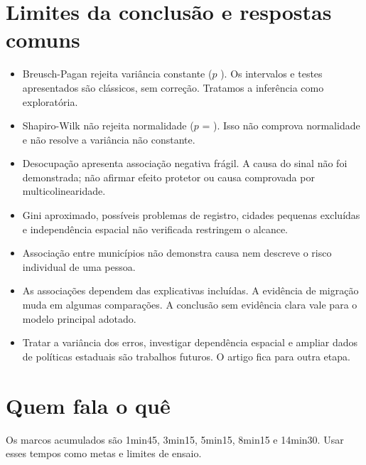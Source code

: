 \section{Limites da conclusão e respostas comuns}
\begin{itemize}
\item Breusch-Pagan rejeita variância constante ($p$ \nBPp). Os intervalos e testes apresentados são clássicos, sem correção. Tratamos a inferência como exploratória.
\item Shapiro-Wilk não rejeita normalidade ($p$ = \nSWp). Isso não comprova normalidade e não resolve a variância não constante.
\item Desocupação apresenta associação negativa frágil. A causa do sinal não foi demonstrada; não afirmar efeito protetor ou causa comprovada por multicolinearidade.
\item Gini aproximado, possíveis problemas de registro, cidades pequenas excluídas e independência espacial não verificada restringem o alcance.
\item Associação entre municípios não demonstra causa nem descreve o risco individual de uma pessoa.
\item As associações dependem das explicativas incluídas. A evidência de migração muda em algumas comparações. A conclusão sem evidência clara vale para o modelo principal adotado.
\item Tratar a variância dos erros, investigar dependência espacial e ampliar dados de políticas estaduais são trabalhos futuros. O artigo fica para outra etapa.
\end{itemize}

\section{Quem fala o quê}

Os marcos acumulados são 1min45, 3min15, 5min15, 8min15 e 14min30. Usar esses tempos como metas e limites de ensaio.

